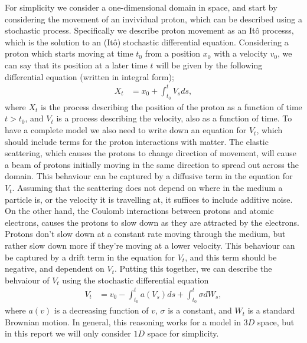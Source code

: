 For simplicity we consider a one-dimensional domain in space, and start by considering the movement of an invividual proton, which can be described using a stochastic process. Specifically we describe proton movement as an Itô processs, which is the solution to an (Itô) stochastic differential equation. Considering a proton which starts moving at time $t_0$ from a position $x_0$ with a velocity $v_0$, we can say that its position at a later time $t$ will be given by the following differential equation (written in integral form);
%
\begin{align} 
    \label{eq:x-sde}
    X_t &= x_0 + \int_{t_0}^{t} V_s ds,
\end{align}
%
where $X_t$ is the process describing the position of the proton as a function of time $t>t_0$, and $V_t$ is a process describing the velocity, also as a function of time. To have a complete model we also need to write down an equation for $V_t$, which should include terms for the proton interactions with matter. The elastic scattering, which causes the protons to change direction of movement, will cause a beam of protons initially moving in the same direction to spread out across the domain. This behaviour can be captured by a diffusive term in the equation for $V_t$. Assuming that the scattering does not depend on where in the medium a particle is, or the velocity it is travelling at, it suffices to include additive noise. On the other hand, the Coulomb interactions between protons and atomic electrons, causes the protons to slow down as they are attracted by the electrons. Protons don't slow down at a constant rate moving through the medium, but rather slow down more if they're moving at a lower velocity. This behaviour can be captured by a drift term in the equation for $V_t$, and this term should be negative, and dependent on $V_t$. Putting this together, we can describe the behvaiour of $V_t$ using the stochastic differential equation 
%
\begin{align} 
    \label{eq:v-sde}
    V_t &= v_0 - \int_{t_0}^{t} a(V_s) ds + \int_{t_0}^{t} \sigma dW_s,
\end{align}
% 
where $a(v)$ is a decreasing function of $v$, $\sigma$ is a constant, and $W_t$ is a standard Brownian motion. In general, this reasoning works for a model in $3D$ space, but in this report we will only consider $1D$ space for simplicity.

